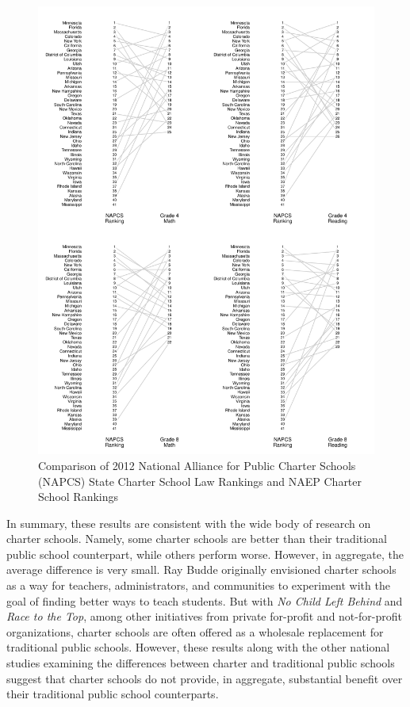 \documentclass[letterpaper,12p,twoside]{article} %
\begin{document}
\begin{figure}[t]
\begin{center}
\includegraphics[width=\textwidth]{../Figures2009/StateRankings.pdf}
\caption{Comparison of 2012 National Alliance for Public Charter Schools (NAPCS) State Charter School Law Rankings and NAEP Charter School Rankings}
\label{fig:staterankings}
\end{center}
\end{figure}

In summary, these results are consistent with the wide body of research on charter schools. Namely, some charter schools are better than their traditional public school counterpart, while others perform worse. However, in aggregate, the average difference is very small. Ray Budde originally envisioned charter schools as a way for teachers, administrators, and communities to experiment with the goal of finding better ways to teach students. But with \textit{No Child Left Behind} and \textit{Race to the Top}, among other initiatives from private for-profit and not-for-profit organizations, charter schools are often offered as a wholesale replacement for traditional public schools. However, these results along with the other national studies examining the differences between charter and traditional public schools suggest that charter schools do not provide, in aggregate, substantial benefit over their traditional public school counterparts.



\cleardoublepage




\end{document}
